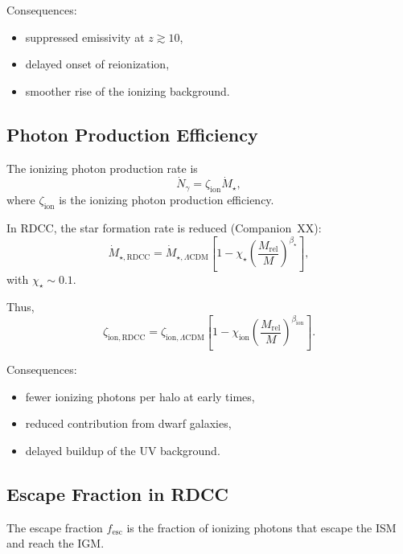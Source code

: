 \documentclass[11pt,a4paper]{article}
\begin{document}
Consequences:
\begin{itemize}
\item suppressed emissivity at $z \gtrsim 10$,
\item delayed onset of reionization,
\item smoother rise of the ionizing background.
\end{itemize}

\subsection{Photon Production Efficiency}

The ionizing photon production rate is
\begin{equation}
\dot{N}_{\gamma}
=
\zeta_{\mathrm{ion}}
\dot{M}_{\star},
\end{equation}
where $\zeta_{\mathrm{ion}}$ is the ionizing photon production efficiency.

In RDCC, the star formation rate is reduced (Companion~XX):
\begin{equation}
\dot{M}_{\star,\mathrm{RDCC}}
=
\dot{M}_{\star,\Lambda\mathrm{CDM}}
\left[
1
-
\chi_{\star}
\left(
\frac{M_{\mathrm{rel}}}{M}
\right)^{\beta_{\star}}
\right],
\end{equation}
with $\chi_{\star} \sim 0.1$.

Thus,
\begin{equation}
\zeta_{\mathrm{ion,RDCC}}
=
\zeta_{\mathrm{ion},\Lambda\mathrm{CDM}}
\left[
1
-
\chi_{\mathrm{ion}}
\left(
\frac{M_{\mathrm{rel}}}{M}
\right)^{\beta_{\mathrm{ion}}}
\right].
\end{equation}

Consequences:
\begin{itemize}
\item fewer ionizing photons per halo at early times,
\item reduced contribution from dwarf galaxies,
\item delayed buildup of the UV background.
\end{itemize}

\subsection{Escape Fraction in RDCC}

The escape fraction $f_{\mathrm{esc}}$ is the fraction of ionizing photons that escape the ISM and
reach the IGM.
\end{document}
